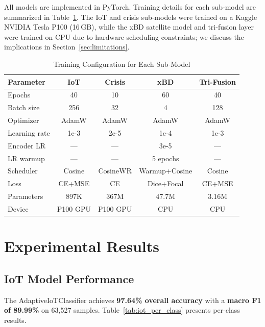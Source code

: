 \documentclass[journal]{IEEEtran}
\begin{document}
All models are implemented in PyTorch. Training details for each sub-model are summarized in Table~\ref{tab:training_config}. The IoT and crisis sub-models were trained on a Kaggle NVIDIA Tesla P100 (16\,GB), while the xBD satellite model and tri-fusion layer were trained on CPU due to hardware scheduling constraints; we discuss the implications in Section~\ref{sec:limitations}.

\begin{table}[!t]
\centering
\caption{Training Configuration for Each Sub-Model}
\label{tab:training_config}
\begin{tabular}{lcccc}
\toprule
\textbf{Parameter} & \textbf{IoT} & \textbf{Crisis} & \textbf{xBD} & \textbf{Tri-Fusion} \\
\midrule
Epochs & 40 & 10 & 60 & 40 \\
Batch size & 256 & 32 & 4 & 128 \\
Optimizer & AdamW & AdamW & AdamW & AdamW \\
Learning rate & 1e-3 & 2e-5 & 1e-4 & 1e-3 \\
Encoder LR & --- & --- & 3e-5 & --- \\
LR warmup & --- & --- & 5 epochs & --- \\
Scheduler & Cosine & CosineWR & Warmup+Cosine & Cosine \\
Loss & CE+MSE & CE & Dice+Focal & CE+MSE \\
Parameters & 897K & 367M & 47.7M & 3.16M \\
Device & P100 GPU & P100 GPU & CPU & CPU \\
\bottomrule
\end{tabular}
\end{table}

\section{Experimental Results}

\subsection{IoT Model Performance}

The AdaptiveIoTClassifier achieves \textbf{97.64\% overall accuracy} with a \textbf{macro F1 of 89.99\%} on 63,527 samples. Table~\ref{tab:iot_per_class} presents per-class results.
\end{document}
